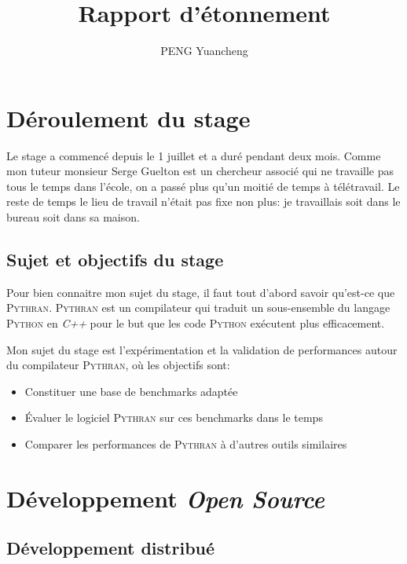 \documentclass[a4paper, 11pt]{article}
\newcommand\Pythran{\textsc{Pythran}}
\newcommand\Python{\textsc{Python}}
\begin{document}
\title{Rapport d'étonnement}
\author{PENG Yuancheng}
\maketitle

\tableofcontents
\setcounter{tocdepth}{3}
\pagebreak

\section{Déroulement du stage}
\label{sec:deroulement-stage}

Le stage a commencé depuis le 1 juillet et a duré pendant deux mois.
Comme mon tuteur monsieur Serge Guelton est un chercheur associé qui ne travaille
pas tous le temps dans l'école, on a passé plus qu'un moitié de temps à
télétravail. Le reste de temps le lieu de travail n'était pas fixe non plus:
je travaillais soit dans le bureau soit dans sa maison.

\subsection*{Sujet et objectifs du stage}

Pour bien connaitre mon sujet du stage, il faut tout d'abord savoir qu'est-ce
que \Pythran{}. \Pythran{} est un compilateur qui traduit un sous-ensemble du
langage \Python{} en \emph{C++} pour le but que les code \Python{} exécutent plus
efficacement.

Mon sujet du stage est l'expérimentation et la validation de performances
autour du compilateur \Pythran{}, où les objectifs sont:

  \begin{itemize}
    \item Constituer une base de benchmarks adaptée
    \item Évaluer le logiciel \Pythran{} sur ces benchmarks dans le temps
    \item Comparer les performances de \Pythran{} à d'autres outils similaires
  \end{itemize}

\section{Développement \emph{Open Source}}
\label{sec:developpement-open-source}

\subsection*{Développement distribué}
\end{document}
